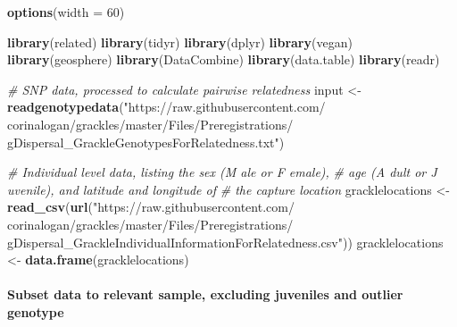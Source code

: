 \documentclass[]{article}
\newenvironment{Shaded}{\begin{snugshade}}{\end{snugshade}}
\newcommand{\CommentTok}[1]{\textcolor[rgb]{0.56,0.35,0.01}{\textit{#1}}}
\newcommand{\DataTypeTok}[1]{\textcolor[rgb]{0.13,0.29,0.53}{#1}}
\newcommand{\DecValTok}[1]{\textcolor[rgb]{0.00,0.00,0.81}{#1}}
\newcommand{\KeywordTok}[1]{\textcolor[rgb]{0.13,0.29,0.53}{\textbf{#1}}}
\newcommand{\NormalTok}[1]{#1}
\newcommand{\OperatorTok}[1]{\textcolor[rgb]{0.81,0.36,0.00}{\textbf{#1}}}
\newcommand{\StringTok}[1]{\textcolor[rgb]{0.31,0.60,0.02}{#1}}
\let\oldparagraph\paragraph
\renewcommand{\paragraph}[1]{\oldparagraph{#1}\mbox{}}
\begin{document}
\begin{Shaded}
\begin{Highlighting}[]
\KeywordTok{options}\NormalTok{(}\DataTypeTok{width =} \DecValTok{60}\NormalTok{)}

\KeywordTok{library}\NormalTok{(related)}
\KeywordTok{library}\NormalTok{(tidyr)}
\KeywordTok{library}\NormalTok{(dplyr)}
\KeywordTok{library}\NormalTok{(vegan)}
\KeywordTok{library}\NormalTok{(geosphere)}
\KeywordTok{library}\NormalTok{(DataCombine)}
\KeywordTok{library}\NormalTok{(data.table)}
\KeywordTok{library}\NormalTok{(readr)}

\CommentTok{# SNP data, processed to calculate pairwise relatedness}
\NormalTok{input <-}\StringTok{ }\KeywordTok{readgenotypedata}\NormalTok{(}\StringTok{"https://raw.githubusercontent.com/}
\StringTok{                        corinalogan/grackles/master/Files/Preregistrations/}
\StringTok{                        gDispersal_GrackleGenotypesForRelatedness.txt"}\NormalTok{)}

\CommentTok{# Individual level data, listing the sex (M ale or F emale),}
\CommentTok{# age (A dult or J uvenile), and latitude and longitude of}
\CommentTok{# the capture location}
\NormalTok{gracklelocations <-}\StringTok{ }\KeywordTok{read_csv}\NormalTok{(}\KeywordTok{url}\NormalTok{(}\StringTok{"https://raw.githubusercontent.com/}
\StringTok{                              corinalogan/grackles/master/Files/Preregistrations/}
\StringTok{                              gDispersal_GrackleIndividualInformationForRelatedness.csv"}\NormalTok{))}
\NormalTok{gracklelocations <-}\StringTok{ }\KeywordTok{data.frame}\NormalTok{(gracklelocations)}
\end{Highlighting}
\end{Shaded}

\hypertarget{subset-data-to-relevant-sample-excluding-juveniles-and-outlier-genotype}{%
\paragraph{Subset data to relevant sample, excluding juveniles and
outlier
genotype}\label{subset-data-to-relevant-sample-excluding-juveniles-and-outlier-genotype}}

\begin{Shaded}
\end{Shaded}
\end{document}

